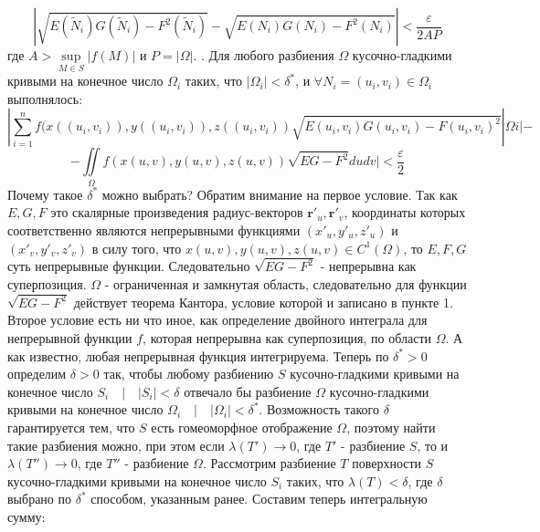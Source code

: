 \documentclass[12pt,a4paper]{article}
\begin{document}
	\[ |\sqrt{E(\tilde N_{i})G(\tilde N_{i}) - F^2(\tilde N_{i})} - \sqrt{E(N_{i})G(N_{i}) - F^2(N_{i})}| < \frac{\varepsilon}{2AP}\]
	где $A > \sup\limits_{M \in S}|f(M)|$ и $P = |\Omega|$.
	. Для любого разбиения $\Omega$ кусочно-гладкими кривыми на конечное число $\Omega_{i}$ таких, что $|\Omega_{i}| < \delta^{*}$, и $\forall N_{i} = (u_{i}, v_{i}) \in \Omega_{i}$ выполнялось:
	\[ |   \sum\limits_{i=1}^n f(x((u_{i}, v_{i})), y((u_{i}, v_{i})), z((u_{i}, v_{i}))\sqrt{E(u_{i}, v_{i})G(u_{i}, v_{i}) - F(u_{i}, v_{i})^2}|\Omega{i}| - \]
	\[ - \iint\limits_{\Omega} f(x(u,v), y(u,v), z(u,v)) \sqrt{EG - F^2} dudv | < \frac{\varepsilon}{2}\]
	Почему такое $\delta^{*}$ можно выбрать?
	\newline
	Обратим внимание на первое условие. Так как $E, G, F$ это скалярные произведения радиус-векторов $\textbf{r}'_{u}, \textbf{r}'_{v}$, координаты которых соответственно являются непрерывными функциями $(x'_{u}, y'_{u}, z'_{u})$ и $(x'_{v}, y'_{v}, z'_{v})$ в силу того, что $x(u,v), y(u,v), z(u,v) \in C^{1}(\Omega)$, то $E, F, G$ суть непрерывные функции. Следовательно $\sqrt{EG - F^2}$ - непрерывна как суперпозиция. $\Omega$ - ограниченная и замкнутая область, следовательно для функции $\sqrt{EG - F^2}$ действует теорема Кантора, условие которой и записано в пункте 1.
	\newline
	Второе условие есть ни что иное, как определение двойного интеграла для непрерывной функции $f$, которая непрерывна как суперпозиция, по области $\Omega$. А как известно, любая непрерывная функция интегрируема.
	\newline
	\newline
	Теперь по $\delta^{*} > 0$ определим $\delta > 0$  так, чтобы любому разбиению $S$ кусочно-гладкими кривыми на конечное число $S_{i} \quad | \quad |S_{i}| < \delta$ отвечало бы разбиение $\Omega$ кусочно-гладкими кривыми на конечное число $\Omega_{i} \quad | \quad |\Omega_{i}| < \delta^{*}$. Возможность такого $\delta$ гарантируется тем, что $S$ есть гомеоморфное отображение $\Omega$, поэтому найти такие разбиения можно, при этом если $\lambda(T') \rightarrow 0$, где $T'$ - разбиение $S$, то и $\lambda(T'') \rightarrow 0$, где $T''$ - разбиение $\Omega$.
	\newline
	\newline
	Рассмотрим разбиение $T$ поверхности $S$ кусочно-гладкими кривыми на конечное число $S_{i}$ таких, что $\lambda(T) < \delta$, где $\delta$ выбрано по $\delta^{*}$ способом, указанным ранее. Составим теперь интегральную сумму:
\end{document}

